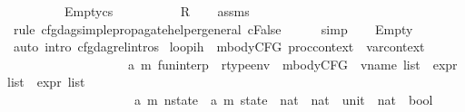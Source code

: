 \begin{isabellebody}
\ \ \ \ \ \ \ \ \ Empty{\isacharcolon}{\kern0pt}{\isachardoublequoteopen}cs\ {\isacharequal}{\kern0pt}\ {\isacharbrackleft}{\kern0pt}{\isacharbrackright}{\kern0pt}{\isachardoublequoteclose}\isanewline
\ \ \ \ \ \ \ \ {\isachardoublequoteopen}R{\isachardoublequoteclose}\isanewline
%
\isadelimproof
\ \ %
\endisadelimproof
%
\isatagproof
{}\isamarkupfalse%
\ assms{\isacharparenleft}{\kern0pt}{}{\isacharminus}{\kern0pt}{}{\isacharparenright}{\kern0pt}\isanewline
\ \ \isamarkupfalse%
\ {\isacharparenleft}{\kern0pt}rule\ cfg{\isacharunderscore}{\kern0pt}dag{\isacharunderscore}{\kern0pt}simple{\isacharunderscore}{\kern0pt}propagate{\isacharunderscore}{\kern0pt}helper{\isacharunderscore}{\kern0pt}general{\isacharbrackleft}{\kern0pt}\ {\isacharquery}{\kern0pt}c{\isacharequal}{\kern0pt}False{\isacharbrackright}{\kern0pt}{\isacharparenright}{\kern0pt}\isanewline
\ \ \ \ \isamarkupfalse%
\ simp\isanewline
\ \ \isamarkupfalse%
\ Empty\isanewline
\ \ \isamarkupfalse%
\ {\isacharparenleft}{\kern0pt}auto\ intro{\isacharcolon}{\kern0pt}\ cfg{\isacharunderscore}{\kern0pt}dag{\isacharunderscore}{\kern0pt}rel{\isachardot}{\kern0pt}intros{\isacharparenright}{\kern0pt}%
\endisatagproof
{\isafoldproof}%
%
\isadelimproof
\isanewline
%
\endisadelimproof
\isanewline
{}\isamarkupfalse%
\ loop{\isacharunderscore}{\kern0pt}ih\ {\isacharcolon}{\kern0pt}{\isacharcolon}{\kern0pt}\ {\isachardoublequoteopen}mbodyCFG\ proc{\isacharunderscore}{\kern0pt}context\ {\isasymRightarrow}\ var{\isacharunderscore}{\kern0pt}context\ {\isasymRightarrow}\ \isanewline
\ \ \ \ \ \ \ \ \ \ \ \ \ \ \ \ \ \ \ {\isacharparenleft}{\kern0pt}{\isacharprime}{\kern0pt}a{\isacharcomma}{\kern0pt}\ {\isacharprime}{\kern0pt}m{\isacharparenright}{\kern0pt}\ fun{\isacharunderscore}{\kern0pt}interp\ {\isasymRightarrow}\ rtype{\isacharunderscore}{\kern0pt}env\ {\isasymRightarrow}\ mbodyCFG\ {\isasymRightarrow}\ vname\ list\ {\isasymRightarrow}\ expr\ list\ {\isasymRightarrow}\ expr\ list\ {\isasymRightarrow}\isanewline
\ \ \ \ \ \ \ \ \ \ \ \ \ \ \ \ \ \ \ \ {\isacharparenleft}{\kern0pt}{\isacharprime}{\kern0pt}a{\isacharcomma}{\kern0pt}\ {\isacharprime}{\kern0pt}m{\isacharparenright}{\kern0pt}\ nstate\ {\isasymRightarrow}\ {\isacharparenleft}{\kern0pt}{\isacharprime}{\kern0pt}a{\isacharcomma}{\kern0pt}\ {\isacharprime}{\kern0pt}m{\isacharparenright}{\kern0pt}\ state\ {\isasymRightarrow}\ nat\ {\isasymRightarrow}\ nat\ {\isacharplus}{\kern0pt}\ unit\ {\isasymRightarrow}\ nat\ {\isasymRightarrow}\ bool{\isachardoublequoteclose}\isanewline

\end{isabellebody}
